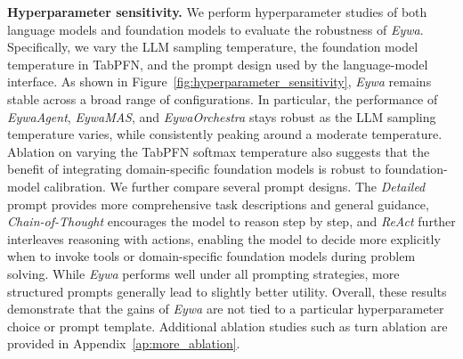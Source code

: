 \documentclass{llmxive}
\providecommand{\arraystretch}{1.25}
\begin{document}
{\textbf{Hyperparameter sensitivity.} We perform hyperparameter studies of both language models and foundation models to evaluate the robustness of \textit{Eywa}. Specifically, we vary the LLM sampling temperature, the foundation model temperature in TabPFN, and the prompt design used by the language-model interface. As shown in Figure~\ref{fig:hyperparameter_sensitivity}, \textit{Eywa} remains stable across a broad range of configurations. In particular, the performance of \textit{EywaAgent}, \textit{EywaMAS}, and \textit{EywaOrchestra} stays robust as the LLM sampling temperature varies, while consistently peaking around a moderate temperature. Ablation on varying the TabPFN softmax temperature also suggests that the benefit of integrating domain-specific foundation models is robust to foundation-model calibration. We further compare several prompt designs. The \textit{Detailed} prompt provides more comprehensive task descriptions and general guidance, \textit{Chain-of-Thought} \cite{DBLP:conf/nips/Wei0SBIXCLZ22} encourages the model to reason step by step, and \textit{ReAct} \cite{DBLP:conf/iclr/YaoZYDSN023} further interleaves reasoning with actions, enabling the model to decide more explicitly when to invoke tools or domain-specific foundation models during problem solving. While \textit{Eywa} performs well under all prompting strategies, more structured prompts generally lead to slightly better utility. Overall, these results demonstrate that the gains of \textit{Eywa} are not tied to a particular hyperparameter choice or prompt template. Additional ablation studies such as turn ablation are provided in Appendix~\ref{ap:more_ablation}.



\renewcommand{\arraystretch}{1.00}
\begin{table}[t]
\centering
    \label{tab:model_ablation_compact}
\end{table}}
\end{document}
